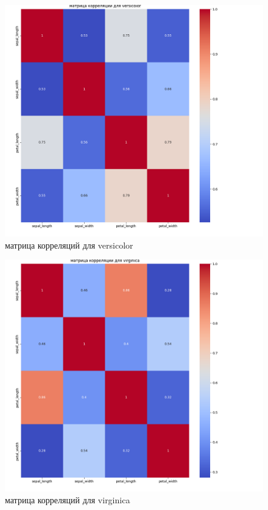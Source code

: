 \documentclass[12pt]{report}
\begin{document}
\begin{figure}[h!]
  \centering
  \includegraphics[width = \linewidth /2]{matrix_versicolor.png}
  \caption{матрица корреляций для versicolor}
  \label{fig:versicolor}
\end{figure}

\begin{figure}[h!]
  \centering
  \includegraphics[width = \linewidth /2]{matrix_virginica.png}
  \caption{матрица корреляций для virginica}
  \label{fig:virginica}
\end{figure}
\end{document}
